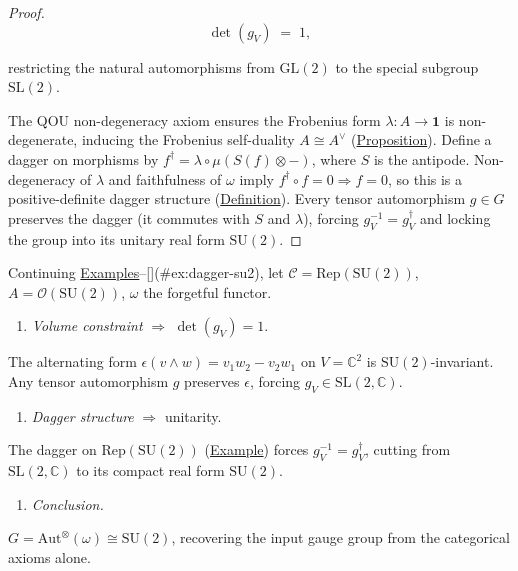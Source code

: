 \begin{proof}
\begin{equation}\label{eq:det-one}
  \det(g_V) \;=\; 1,
\end{equation}

restricting the natural automorphisms from $\mathrm{GL}(2)$ to the
special subgroup $\mathrm{SL}(2)$.

The QOU non-degeneracy axiom ensures the Frobenius form
$\lambda \colon A \to \mathbf{1}$ is non-degenerate, inducing the
Frobenius self-duality $A \cong A^{\vee}$
(\hyperref[prop:fiber-adjoint-involution]{Proposition}). Define a dagger on
morphisms by $f^{\dagger} = \lambda \circ \mu(S(f) \otimes -)$, where
$S$ is the antipode. Non-degeneracy of $\lambda$ and faithfulness
of $\omega$ imply $f^{\dagger} \circ f = 0 \Rightarrow f = 0$, so this
is a positive-definite dagger structure
(\hyperref[def:positive-definite-dagger]{Definition}). Every tensor
automorphism $g \in G$ preserves the dagger (it commutes with $S$ and
$\lambda$), forcing $g_V^{-1} = g_V^{\dagger}$ and locking the group
into its unitary real form $\mathrm{SU}(2)$.
\end{proof}

\begin{example}
  \label{ex:su2-emergence}
Continuing \hyperref[ex:frobenius-su2]{Examples}--[](#ex:dagger-su2), let
$\mathcal{C} = \mathrm{Rep}(\mathrm{SU}(2))$,
$A = \mathcal{O}(\mathrm{SU}(2))$, $\omega$ the forgetful functor.

\begin{enumerate}
  \item \emph{Volume constraint} $\Rightarrow$ $\det(g_V) = 1$.
\end{enumerate}
   The alternating form $\epsilon(v \wedge w) = v_1 w_2 - v_2 w_1$
   on $V = \mathbb{C}^2$ is $\mathrm{SU}(2)$-invariant. Any tensor
   automorphism $g$ preserves $\epsilon$, forcing
   $g_V \in \mathrm{SL}(2, \mathbb{C})$.
\begin{enumerate}
  \item \emph{Dagger structure} $\Rightarrow$ unitarity.
\end{enumerate}
   The dagger on $\mathrm{Rep}(\mathrm{SU}(2))$
   (\hyperref[ex:dagger-su2]{Example}) forces
   $g_V^{-1} = g_V^{\dagger}$, cutting from
   $\mathrm{SL}(2, \mathbb{C})$ to its compact real form
   $\mathrm{SU}(2)$.
\begin{enumerate}
  \item \emph{Conclusion.}
\end{enumerate}
   $G = \mathrm{Aut}^{\otimes}(\omega) \cong \mathrm{SU}(2)$,
   recovering the input gauge group from the categorical axioms
   alone.
\end{example}


